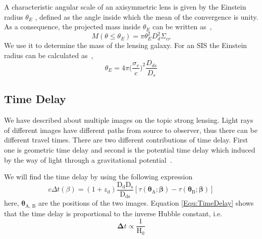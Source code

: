 \noindent
A characteristic angular scale of an axisymmetric lens is given by the Einstein radius $ \theta_{E} $ , defined as the angle inside which the mean of the convergence is unity. As a consequence, the projected mass inside $ \theta_{E} $ can be written as~\cite{manual},
\begin{equation}
M(\theta \le \theta_{E})=\pi \theta^2_{E}D^2_{d}\Sigma_{cr}
\label{math:projMass}
\end{equation}
\noindent
We use it to determine the mass of the lensing galaxy. For an SIS the Einstein radius can be calculated as~\cite{manual},
\begin{equation}
\theta_{E}=4\pi\bigg( \frac{\sigma_{v}}{c}\bigg)^2\frac{D_{ds}}{D_{s}}
\label{Equ:ThetaE}
\end{equation}

\subsection{Time Delay}
We have described about multiple images on the topic strong lensing. Light rays of different images have different paths from source to observer, thus there can be different travel times. There are two different contributions of time delay. First one is geometric time delay 
and second is the potential time delay which induced by the way of light through a gravitational potential~\cite{manual}.

We will find the time delay by using the following expression~\cite{manual}
\begin{equation}
c\Delta t(\beta)=(1+z_{\text{d}})\frac{\text{D}_{\text{d}}\text{D}_{\text{s}}}{\text{D}_{\text{ds}}}[\tau(\pmb\theta_{\text{A}}; \pmb\beta)-\tau(\pmb\theta_{\text{B}}; \pmb\beta)]
\label{Equ:TimeDelay}
\end{equation}
\noindent
here, $ \pmb\theta_{\text{A, B}} $ are the positions of the two images. Equation \ref{Equ:TimeDelay} shows that the time delay is proportional to the inverse Hubble constant, i.e.
\begin{equation}
\pmb\Delta t \propto \frac{1}{\text{H}_{0}}
\end{equation}


